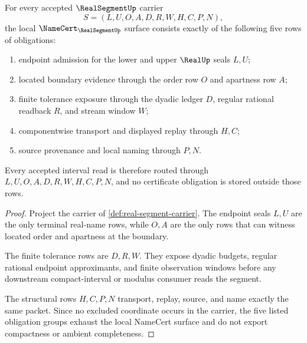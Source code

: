 \begin{theorem}
\label{thm:real-segment-namecert-obligations}
For every accepted $\RealSegmentUp$ carrier
$$
S=(L,U,O,A,D,R,W,H,C,P,N),
$$
the local $\NameCert_{\RealSegmentUp}$ surface consists exactly of the following five rows of obligations:
\begin{enumerate}
\item endpoint admission for the lower and upper $\RealUp$ seals $L,U$;
\item located boundary evidence through the order row $O$ and apartness row $A$;
\item finite tolerance exposure through the dyadic ledger $D$, regular rational readback $R$, and stream window $W$;
\item componentwise transport and displayed replay through $H,C$;
\item source provenance and local naming through $P,N$.
\end{enumerate}
Every accepted interval read is therefore routed through $L,U,O,A,D,R,W,H,C,P,N$, and no certificate obligation is stored outside those rows.
\end{theorem}
\begin{proof}
Project the carrier of \autoref{def:real-segment-carrier}. The endpoint seals $L,U$ are the only terminal real-name rows, while $O,A$ are the only rows that can witness located order and apartness at the boundary.

The finite tolerance rows are $D,R,W$. They expose dyadic budgets, regular rational endpoint approximants, and finite observation windows before any downstream compact-interval or modulus consumer reads the segment.

The structural rows $H,C,P,N$ transport, replay, source, and name exactly the same packet. Since no excluded coordinate occurs in the carrier, the five listed obligation groups exhaust the local NameCert surface and do not export compactness or ambient completeness.
\end{proof}

